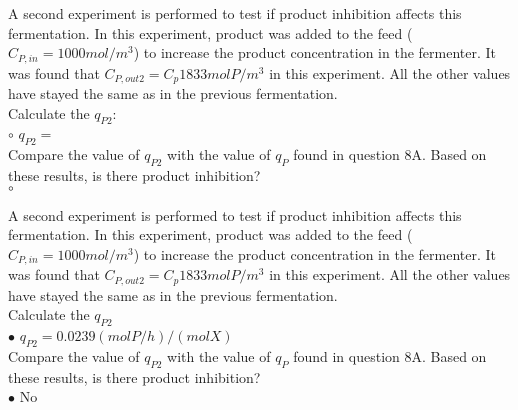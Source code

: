 \documentclass[]{beamer}
\begin{document}
\begin{frame}[shrink] {}
A second experiment is performed to test if product inhibition affects this fermentation. In this experiment, product was added to the feed ($C_{P,in} = 1000 mol/m^3$) to increase the product concentration in the fermenter. It was found that $C_{P,out2} =C_p  1833 mol P/m^3$ in this experiment. All the other values have stayed the same as in the previous fermentation. \\[0.3em]
Calculate the $q_{P2}$: \\ [0.3em]
{\color{red}$\circ$} $q_{P2}=$\\[0.5em]
Compare the value of $q_{P2}$ with the value of $q_{P}$ found in question 8A. Based on these results, is there product inhibition? \\[0.3em]
{\color{red}$\circ$} \\
\end{frame}
\begin{frame}[shrink] {}
A second experiment is performed to test if product inhibition affects this fermentation. In this experiment, product was added to the feed ($C_{P,in} = 1000 mol/m^3$) to increase the product concentration in the fermenter. It was found that $C_{P,out2} =C_p  1833 mol P/m^3$ in this experiment. All the other values have stayed the same as in the previous fermentation. \\[0.3em]
Calculate the $q_{P2}$ \\
{\color{red}$\bullet$} $q_{P2}=0.0239(molP/h)/(molX)$ \\[0.5em]
Compare the value of $q_{P2}$ with the value of $q_{P}$ found in question 8A. Based on these results, is there product inhibition? \\
{\color{red}$\bullet$} No \\
\end{frame}

\end{document}
